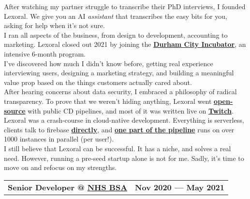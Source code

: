 \documentclass[hidelinks, 12pt, a4paper]{article}
\begin{document}
	\begin{multicols}{2}
		After watching my partner struggle to transcribe their PhD interviews, I founded Lexoral.
		We give you an AI \emph{assistant} that transcribes the easy bits for you, asking for help when it's not sure.\\
		
		I ran all aspects of the business, from design to development, accounting to marketing.
		Lexoral closed out 2021 by joining the \href{https://dcincubator.co.uk/}{\textbf{Durham City Incubator}}, an intensive 6-month program.\\
		
		I've discovered how much I didn't know before, getting real experience interviewing users, designing a marketing strategy, and building a meaningful value prop based on the things customers actually cared about.\\
		
		After hearing concerns about data security, I embraced a philosophy of radical transparency.
		To prove that we weren't hiding anything, Lexoral went \href{https://github.com/stevenwaterman/Lexoral/}{\textbf{open-source}} with public CD pipelines, and most of it was written live on \href{https://twitch.tv/lexoral}{\textbf{Twitch}}.\\
		
		Lexoral was a crash-course in cloud-native development.
		Everything is serverless, clients talk to firebase \href{https://lexoral.com/blog/svelte-firestore-binding/}{\textbf{directly}}, and \href{https://twitter.com/SteWaterman/status/1445041856023339011}{\textbf{one part of the pipeline}} runs on over 1000 instances in parallel (per user!).\\
		
		I still believe that Lexoral can be successful.
		It has a niche, and solves a real need.
		However, running a pre-seed startup alone is not for me.
		Sadly, it's time to move on and refocus on my strengths.\\
		
	\end{multicols}


	\begin{tabularx}{\linewidth}{@{}Xr@{}}
		\textbf{Senior Developer @ \href{https://www.nhsbsa.nhs.uk/}{NHS BSA}} & \textbf{Nov 2020 --- May 2021}
	\end{tabularx}\vspace{2pt}
	
\end{document}
